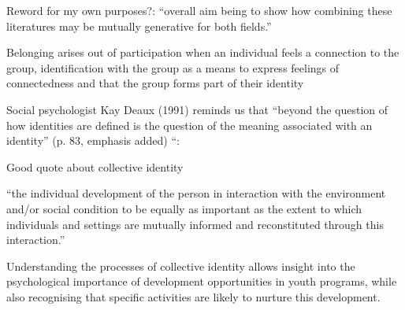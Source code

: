 Reword for my own purposes?: “overall aim being to show how combining these literatures may be mutually generative for both fields.”



Belonging arises out of participation when an individual feels a connection to the group, identification with the group as a means to express feelings of connectedness and that the group forms part of their identity \cite{Futch2016}

Social psychologist Kay Deaux (1991) reminds us that “beyond the question of how identities are defined is the question of the meaning associated with an identity” (p. 83, emphasis added) “:\cite{Futch2016}

Good quote about collective identity

“the individual development of the person in interaction with the environment and/or social condition to be equally as important as the extent to which individuals and settings are mutually informed and reconstituted through this interaction.” \cite{Futch2016}

Understanding the processes of collective identity allows insight into the psychological importance of development opportunities in youth programs, while also recognising that specific activities are likely to nurture this development.\cite{Futch2016}

